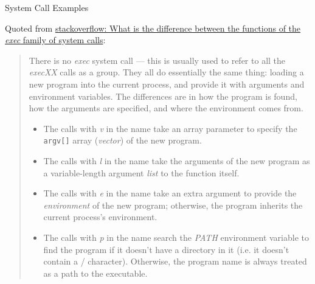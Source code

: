 \begin{frame}{System Call Examples}
  \begin{center}
  \end{center}
\end{frame}

\begin{frame}
  \begin{center}
  \end{center}
\end{frame}

Quoted from
\href{https://stackoverflow.com/questions/20823371/what-is-the-difference-between-the-functions-of-the-exec-family-of-system-calls}{
  stackoverflow: What is the difference between the functions of the \emph{exec} family of system calls}:

\begin{quote}
  There is no \emph{exec} system call --- this is usually used to refer to all the
  \emph{execXX} calls as a group. They all do essentially the same thing: loading a new
  program into the current process, and provide it with arguments and environment
  variables. The differences are in how the program is found, how the arguments are
  specified, and where the environment comes from.

  \begin{itemize}
  \item The calls with \emph{v} in the name take an array parameter to specify the
    \texttt{argv[]} array (\emph{vector}) of the new program.
  \item The calls with \emph{l} in the name take the arguments of the new program as a
    variable-length argument \emph{list} to the function itself.
  \item The calls with \emph{e} in the name take an extra argument to provide the
    \emph{environment} of the new program; otherwise, the program inherits the current
    process's environment.
  \item The calls with \emph{p} in the name search the \emph{PATH} environment variable to
    find the program if it doesn't have a directory in it (i.e. it doesn't contain a /
    character). Otherwise, the program name is always treated as a path to the executable.
  \end{itemize}
\end{quote}

